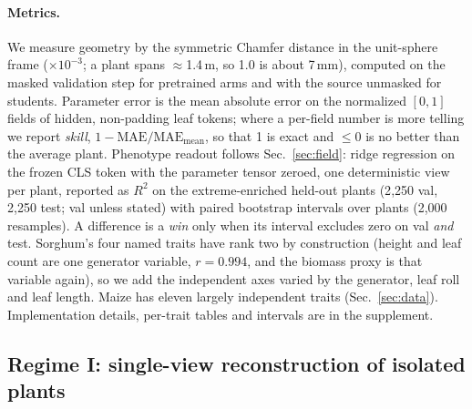 \paragraph{Metrics.}
We measure geometry by the symmetric Chamfer distance in the unit-sphere frame
($\times10^{-3}$; a plant spans $\approx$1.4\,m, so 1.0 is about 7\,mm), computed
on the masked validation step for pretrained arms and with the source unmasked
for students. Parameter error is the mean absolute error on the normalized $[0,1]$
fields of hidden, non-padding leaf tokens; where a per-field number is more
telling we report \emph{skill}, $1-\mathrm{MAE}/\mathrm{MAE}_{\text{mean}}$,
so that 1 is exact and $\le 0$ is no better than the average plant. Phenotype
readout follows Sec.~\ref{sec:field}: ridge regression on the frozen CLS token
with the parameter tensor zeroed, one deterministic view per plant, reported as
$R^2$ on the extreme-enriched held-out plants (2{,}250 val, 2{,}250 test; val
unless stated) with paired bootstrap intervals over plants (2{,}000 resamples).
A difference is a \emph{win} only when its interval excludes zero on val
\emph{and} test. Sorghum's four named traits have rank two by construction
(height and leaf count are one generator variable, $r{=}0.994$, and the biomass
proxy is that variable again), so we add the independent axes varied by the
generator, leaf roll and leaf length. Maize has eleven largely independent
traits (Sec.~\ref{sec:data}). Implementation details, per-trait tables and
intervals are in the supplement.

\subsection{Regime I: single-view reconstruction of isolated plants}
\label{sec:regime1}


